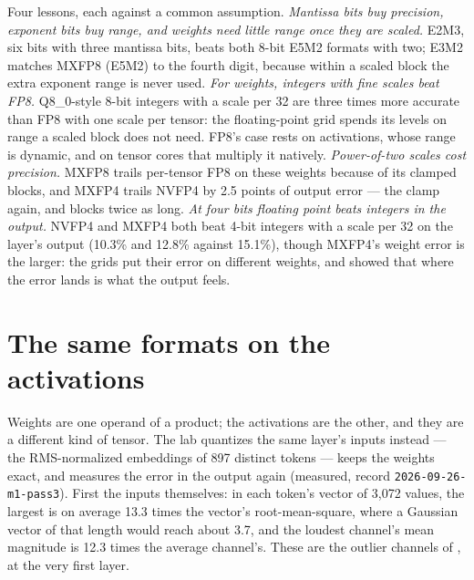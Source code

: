 \noindent Four lessons, each against a common assumption. \emph{Mantissa bits
buy precision, exponent bits buy range, and weights need little range once
they are scaled.} E2M3, six bits with three mantissa bits, beats both 8-bit
E5M2 formats with two; E3M2 matches MXFP8 (E5M2) to the fourth digit, because
within a scaled block the extra exponent range is never used. \emph{For weights,
integers with fine scales beat FP8.} Q8\_0-style 8-bit integers with a scale
per 32 are three times more accurate than FP8 with one scale per tensor: the
floating-point grid spends its levels on range a scaled block does not need.
FP8's case rests on activations, whose range is dynamic, and on tensor cores
that multiply it natively. \emph{Power-of-two scales cost precision.} MXFP8
trails per-tensor FP8 on these weights because of its clamped blocks, and MXFP4
trails NVFP4 by 2.5 points of output error --- the clamp again, and blocks twice
as long. \emph{At four bits floating point beats integers in the output.} NVFP4
and MXFP4 both beat 4-bit integers with a scale per 32 on the layer's output
(10.3\% and 12.8\% against 15.1\%), though MXFP4's weight error is the larger:
the grids put their error on different weights, and 
showed that where the error lands is what the output feels.

\section{The same formats on the activations}

Weights are one operand of a product; the activations are the other, and they
are a different kind of tensor. The lab quantizes the same layer's inputs
instead --- the RMS-normalized embeddings of 897 distinct tokens --- keeps the
weights exact, and measures the error in the output again (measured, record
\texttt{2026-09-26-m1-pass3}). First the inputs themselves: in each token's
vector of 3,072 values, the largest is on average 13.3 times the vector's
root-mean-square, where a Gaussian vector of that length would reach about 3.7,
and the loudest channel's mean magnitude is 12.3 times the average channel's.
These are the outlier channels of , at the very
first layer.


